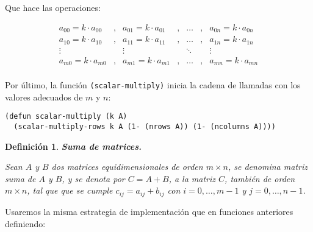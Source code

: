 \documentclass[a4paper,10pt]{article}
\newtheorem{defi}{{Definición}}
\begin{document}
\par \vspace{10pt}

Que hace las operaciones:
 
\par \vspace{10pt}

$$
\begin{array}{ccccccccc}
a_{00} = k\cdot a_{00} & , & a_{01} = k\cdot a_{01} & , & \dots & , & a_{0n} = k\cdot a_{0n} \\
a_{10} = k\cdot a_{10} & , & a_{11} = k\cdot a_{11} & , & \dots & , & a_{1n} = k\cdot a_{1n} \\
\vdots & & \vdots & & \ddots & & \vdots\\
a_{m0} = k\cdot a_{m0} & , & a_{m1} = k\cdot a_{m1} & , & \dots & , & a_{mn} = k\cdot a_{mn} \\
\end{array}
$$

\par \vspace{10pt}	

Por último, la función \texttt{(scalar-multiply)} inicia la cadena de llamadas con los valores adecuados de $m$ y $n$:

\par \vspace{10pt}	

\begin{lstlisting}[language=clips]
(defun scalar-multiply (k A)
  (scalar-multiply-rows k A (1- (nrows A)) (1- (ncolumns A))))
\end{lstlisting}

\par \vspace{12pt}	

\begin{defi} \textbf{Suma de matrices.}\vspace{8pt}\par
Sean $A$ y $B$ dos matrices equidimensionales de orden $m \times n$, se denomina \emph{matriz suma} de $A$ y $B$, y se denota por $C = A+B$, a la matriz $C$, también de orden $m \times n$, tal que que se cumple $c_{ij} = a_{ij} + b_{ij}$ con $i = 0, \dots , m-1$ y $j= 0, \dots , n-1$.
\end{defi}

\par \vspace{10pt}

Usaremos la misma estrategia de implementación que en funciones anteriores definiendo:
\end{document}
